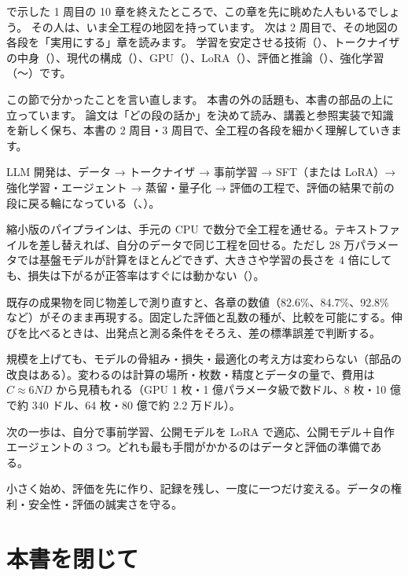 で示した 1 周目の 10 章を終えたところで、この章を先に眺めた人もいるでしょう。
その人は、いま全工程の地図を持っています。
次は 2 周目で、その地図の各段を「実用にする」章を読みます。
学習を安定させる技術（）、トークナイザの中身（）、現代の構成（）、GPU（）、LoRA（）、評価と推論（）、強化学習（〜）です。

この節で分かったことを言い直します。
本書の外の話題も、本書の部品の上に立っています。
論文は「どの段の話か」を決めて読み、講義と参照実装で知識を新しく保ち、本書の 2 周目・3 周目で、全工程の各段を細かく理解していきます。

\begin{summary}
\item LLM 開発は、データ → トークナイザ → 事前学習 → SFT（または LoRA）→ 強化学習・エージェント → 蒸留・量子化 → 評価の工程で、評価の結果で前の段に戻る輪になっている（、）。
\item 縮小版のパイプラインは、手元の CPU で数分で全工程を通せる。テキストファイルを差し替えれば、自分のデータで同じ工程を回せる。ただし 28 万パラメータでは基盤モデルが計算をほとんどできず、大きさや学習の長さを 4 倍にしても、損失は下がるが正答率はすぐには動かない（）。
\item 既存の成果物を同じ物差しで測り直すと、各章の数値（82.6\%、84.7\%、92.8\% など）がそのまま再現する。固定した評価と乱数の種が、比較を可能にする。伸びを比べるときは、出発点と測る条件をそろえ、差の標準誤差で判断する。
\item 規模を上げても、モデルの骨組み・損失・最適化の考え方は変わらない（部品の改良はある）。変わるのは計算の場所・枚数・精度とデータの量で、費用は $C\approx6ND$ から見積もれる（GPU 1 枚・1 億パラメータ級で数ドル、8 枚・10 億で約 340 ドル、64 枚・80 億で約 2.2 万ドル）。
\item 次の一歩は、自分で事前学習、公開モデルを LoRA で適応、公開モデル＋自作エージェントの 3 つ。どれも最も手間がかかるのはデータと評価の準備である。
\item 小さく始め、評価を先に作り、記録を残し、一度に一つだけ変える。データの権利・安全性・評価の誠実さを守る。
\end{summary}

\section*{本書を閉じて}

